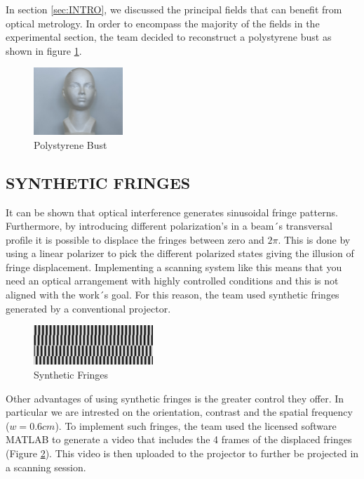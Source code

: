 \label{sec:RESULTS}
In section \ref{sec:INTRO}, we discussed the principal fields that can benefit from optical metrology. In order to encompass the majority of the fields in the experimental section, the team decided to reconstruct a polystyrene bust as shown in figure \ref{fig:Bust}.
\begin{figure}[H]
    \centering
    \includegraphics[width=0.3\textwidth]{Figures/Plain_Bust.jpeg}
    \caption{Polystyrene Bust}
    \label{fig:Bust}
\end{figure}

\subsection{SYNTHETIC FRINGES}
It can be shown that optical interference generates sinusoidal fringe patterns. Furthermore, by introducing different polarization's in a beam´s transversal profile it is possible to displace the fringes between zero and $2\pi$. This is done by using a linear polarizer to pick the different polarized states giving the illusion of fringe displacement. Implementing a scanning system like this means that you need an optical arrangement with highly controlled conditions and this is not aligned with the work´s goal. For this reason, the team used synthetic fringes generated by a conventional projector. \\

\begin{figure}[H]
    \centering
    \includegraphics[width=0.4\textwidth]{Figures/Fringe_Disp.jpg}
    \caption{Synthetic Fringes}
    \label{fig:Fringe_Disp}
\end{figure}

Other advantages of using synthetic fringes is the greater control they offer. In particular we are intrested on the orientation, contrast and the spatial frequency ($w = 0.6 cm$). To implement such fringes, the team used the licensed software MATLAB to generate a video that includes the 4 frames of the displaced fringes (Figure \ref{fig:Fringe_Disp}). This video is then uploaded to the projector to further be projected in a scanning session. \\ 

